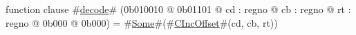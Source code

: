 function clause #\hyperref[zdecode]{decode}# (0b010010 @ 0b01101 @ cd : regno @ cb : regno @ rt : regno @ 0b000 @ 0b000) = #\hyperref[zSome]{Some}#(#\hyperref[zCIncOffset]{CIncOffset}#(cd, cb, rt))
